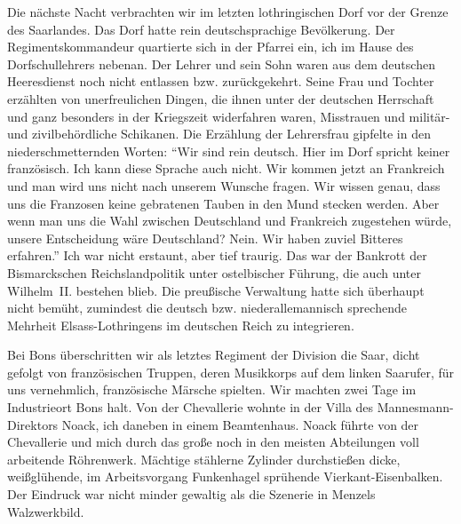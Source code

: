 Die nächste Nacht verbrachten wir im letzten lothringischen Dorf vor der Grenze des Saarlandes. Das Dorf hatte rein deutschsprachige Bevölkerung. Der Regimentskommandeur quartierte sich in der Pfarrei ein, ich im Hause des Dorfschullehrers nebenan. Der Lehrer und sein Sohn waren aus dem deutschen Heeresdienst noch nicht entlassen bzw. zurückgekehrt. Seine Frau und Tochter erzählten von unerfreulichen Dingen, die ihnen unter der deutschen Herrschaft und ganz besonders in der Kriegszeit widerfahren waren, Misstrauen und militär- und zivilbehördliche Schikanen. Die Erzählung der Lehrersfrau gipfelte in den niederschmetternden Worten: \enquote{Wir sind rein deutsch. Hier im Dorf spricht keiner französisch. Ich kann diese Sprache auch nicht. Wir kommen jetzt an Frankreich und man wird uns nicht nach unserem Wunsche fragen. Wir wissen genau, dass uns die Franzosen keine gebratenen Tauben in den Mund stecken werden. Aber wenn man uns die Wahl zwischen Deutschland und Frankreich zugestehen würde, unsere Entscheidung wäre Deutschland? Nein. Wir haben zuviel Bitteres erfahren.} Ich war nicht erstaunt, aber tief traurig. Das war der Bankrott der Bismarckschen Reichslandpolitik unter ostelbischer Führung, die auch unter Wilhelm~II. bestehen blieb. Die preußische Verwaltung hatte sich überhaupt nicht bemüht, zumindest die deutsch bzw. niederallemannisch sprechende Mehrheit Elsass-Lothringens im deutschen Reich zu integrieren.

Bei Bons überschritten wir als letztes Regiment der Division die Saar, dicht gefolgt von französischen Truppen, deren Musikkorps auf dem linken Saar\-ufer, für uns vernehmlich, französische Märsche spielten. Wir machten zwei Tage im Industrieort Bons halt. Von der Chevallerie wohnte in der Villa des Mannesmann-Direktors Noack, ich daneben in einem Beamtenhaus. Noack führte von der Chevallerie und mich durch das große noch in den meisten Abteilungen voll arbeitende Röhrenwerk. Mächtige stählerne Zylinder durchstießen dicke, weißglühende, im Arbeitsvorgang Funkenhagel sprühende Vierkant-Eisenbalken. Der Eindruck war nicht minder gewaltig als die Szenerie in Menzels Walzwerkbild.

